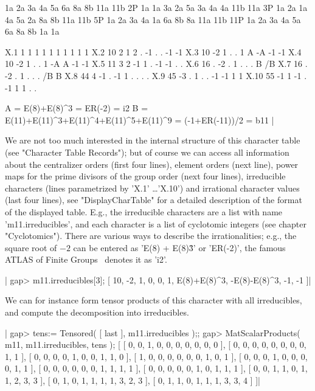             1a 2a 3a 4a 5a 6a 8a 8b 11a 11b
         2P 1a 1a 3a 2a 5a 3a 4a 4a 11b 11a
         3P 1a 2a 1a 4a 5a 2a 8a 8b 11a 11b
         5P 1a 2a 3a 4a 1a 6a 8b 8a 11a 11b
        11P 1a 2a 3a 4a 5a 6a 8a 8b  1a  1a

    X.1      1  1  1  1  1  1  1  1   1   1
    X.2     10  2  1  2  . -1  .  .  -1  -1
    X.3     10 -2  1  .  .  1  A -A  -1  -1
    X.4     10 -2  1  .  .  1 -A  A  -1  -1
    X.5     11  3  2 -1  1  . -1 -1   .   .
    X.6     16  . -2  .  1  .  .  .   B  /B
    X.7     16  . -2  .  1  .  .  .  /B   B
    X.8     44  4 -1  . -1  1  .  .   .   .
    X.9     45 -3  .  1  .  . -1 -1   1   1
    X.10    55 -1  1 -1  . -1  1  1   .   .

    A = E(8)+E(8)^3
      = ER(-2) = i2
    B = E(11)+E(11)^3+E(11)^4+E(11)^5+E(11)^9
      = (-1+ER(-11))/2 = b11 |

We  are not  too  much interested  in  the  internal  structure  of  this
character table (see  "Character Table Records");  but  of course  we can
access all information  about the  centralizer orders (first four lines),
element  orders  (next  line), power  maps for the prime  divisors of the
group order (next four lines), irreducible characters (lines parametrized
by  'X.1'  \ldots 'X.10')  and irrational  character  values  (last  four
lines), see "DisplayCharTable" for a  detailed description  of the format
of the displayed table.  E.g., the irreducible characters are a list with
name  'm11.irreducibles',  and each  character  is a  list  of cyclotomic
integers (see chapter "Cyclotomics").  There are various ways to describe
the  irrationalities; e.g.,  the  square root  of $-2$  can be entered as
'E(8)   +   E(8)\^3'   or   'ER(-2)',  the   famous   ATLAS   of   Finite
Groups~\cite{CCN85} denotes it as 'i2'.

|    gap> m11.irreducibles[3];
    [ 10, -2, 1, 0, 0, 1, E(8)+E(8)^3, -E(8)-E(8)^3, -1, -1 ]|

We  can  for  instance form tensor products of  this  character  with all
irreducibles, and compute the decomposition into irreducibles.

|    gap> tens:= Tensored( [ last ], m11.irreducibles );;
    gap> MatScalarProducts( m11, m11.irreducibles, tens );
    [ [ 0, 0, 1, 0, 0, 0, 0, 0, 0, 0 ], [ 0, 0, 0, 0, 0, 0, 0, 0, 1, 1 ],
      [ 0, 0, 0, 0, 1, 0, 0, 1, 1, 0 ], [ 1, 0, 0, 0, 0, 0, 0, 1, 0, 1 ],
      [ 0, 0, 0, 1, 0, 0, 0, 0, 1, 1 ], [ 0, 0, 0, 0, 0, 0, 1, 1, 1, 1 ],
      [ 0, 0, 0, 0, 0, 1, 0, 1, 1, 1 ], [ 0, 0, 1, 1, 0, 1, 1, 2, 3, 3 ],
      [ 0, 1, 0, 1, 1, 1, 1, 3, 2, 3 ], [ 0, 1, 1, 0, 1, 1, 1, 3, 3, 4 ] ]|

